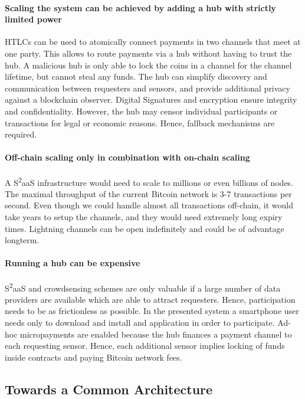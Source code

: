 \paragraph{Scaling the system can be achieved by adding a hub with strictly limited power}

\ac{HTLC}s can be used to atomically connect payments in two channels that meet at one party. This allows to route payments via a hub without having to trust the hub. A malicious hub is only able to lock the coins in a channel for the channel lifetime, but cannot steal any funds. The hub can simplify discovery and communication between requesters and sensors, and provide additional privacy against a blockchain observer. Digital Signatures and encryption ensure integrity and confidentiality. However, the hub may censor individual participants or transactions for legal or economic reasons. Hence, fallback mechanisms are required.

\paragraph{Off-chain scaling only in combination with on-chain scaling}

A S\textsuperscript{2}aaS infrastructure would need to scale to millions or even billions of nodes. The maximal throughput of the current Bitcoin network is 3-7 transactions per second. Even though we could handle almost all transactions off-chain, it would take years to setup the channels, and they would need extremely long expiry times. 
Lightning channels \parencite{poonbitcoin} can be open indefinitely and could be of advantage longterm. 

\paragraph{Running a hub can be expensive}

S\textsuperscript{2}aaS and crowdsensing schemes are only valuable if a large number of data providers are available which are able to attract requesters. Hence, participation needs to be as frictionless as possible. In the presented system a smartphone user needs only to download and install and application in order to participate. Ad-hoc micropayments are enabled because the hub finances a payment channel to each requesting sensor. Hence, each additional sensor implies locking of funds inside contracts and paying Bitcoin network fees.

\subsection{Towards a Common Architecture}

